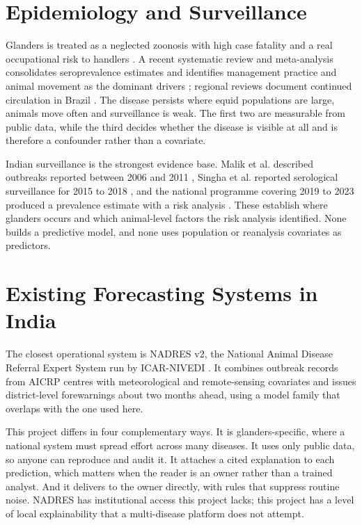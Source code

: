 \documentclass[10pt,openany]{report}
\begin{document}
\section{Epidemiology and Surveillance}

Glanders is treated as a neglected zoonosis with high case fatality and a real occupational risk to
handlers \cite{khan2013,kanani2026}. A recent systematic review and meta-analysis consolidates
seroprevalence estimates and identifies management practice and animal movement as the dominant
drivers \cite{purnama2026}; regional reviews document continued circulation in Brazil
\cite{mota2022}. The disease persists where equid populations are large, animals move often and
surveillance is weak. The first two are measurable from public data, while the third decides whether
the disease is visible at all and is therefore a confounder rather than a covariate.

Indian surveillance is the strongest evidence base. Malik et al. described outbreaks reported
between 2006 and 2011 \cite{malik2012}, Singha et al. reported serological surveillance for 2015 to
2018 \cite{singha2020}, and the national programme covering 2019 to 2023 produced a prevalence
estimate with a risk analysis \cite{singha2026}. These establish where glanders occurs and which
animal-level factors the risk analysis identified. None builds a predictive model, and none uses
population or reanalysis covariates as predictors.

\section{Existing Forecasting Systems in India}

The closest operational system is NADRES v2, the National Animal Disease Referral Expert System run
by ICAR-NIVEDI \cite{nadres}. It combines outbreak records from AICRP centres with meteorological and
remote-sensing covariates and issues district-level forewarnings about two months ahead, using a
model family that overlaps with the one used here.

This project differs in four complementary ways. It is glanders-specific, where a national system
must spread effort across many diseases. It uses only public data, so anyone can reproduce and audit
it. It attaches a cited explanation to each prediction, which matters when the reader is an owner
rather than a trained analyst. And it delivers to the owner directly, with rules that suppress
routine noise. NADRES has institutional access this project lacks; this project has a level of local
explainability that a multi-disease platform does not attempt.
\end{document}

